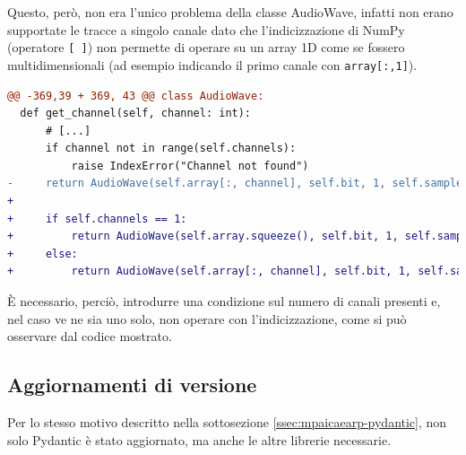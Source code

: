 Questo, però, non era l'unico problema della classe AudioWave, infatti non erano supportate le tracce a singolo canale dato che l'indicizzazione di NumPy (operatore \texttt{[ ]}) non permette di operare su un array 1D come se fossero multidimensionali (ad esempio indicando il primo canale con \texttt{array[:,1]}).
\begin{lstlisting}[language=diff, caption=Modifiche ad AudioWave.get\_channel che permettono di utilizzarlo con tracce ad 1 canale]
@@ -369,39 + 369, 43 @@ class AudioWave:
  def get_channel(self, channel: int):
      # [...]
      if channel not in range(self.channels):
          raise IndexError("Channel not found")
-     return AudioWave(self.array[:, channel], self.bit, 1, self.samplerate)
+  
+     if self.channels == 1:
+         return AudioWave(self.array.squeeze(), self.bit, 1, self.samplerate)
+     else:
+         return AudioWave(self.array[:, channel], self.bit, 1, self.samplerate)
\end{lstlisting}
È necessario, perciò, introdurre una condizione sul numero di canali presenti e, nel caso ve ne sia uno solo, non operare con l'indicizzazione, come si può osservare dal codice mostrato.


\subsection{Aggiornamenti di versione} \label{ssec:mpaicaearp-aggiornamenti}
Per lo stesso motivo descritto nella sottosezione \ref{ssec:mpaicaearp-pydantic}, non solo Pydantic è stato aggiornato, ma anche le altre librerie necessarie.

